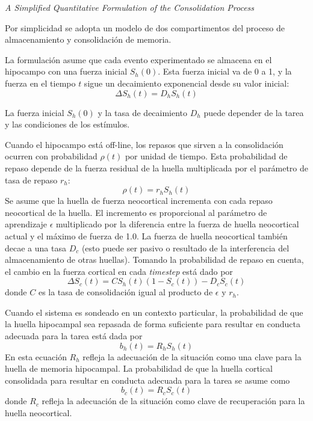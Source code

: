 \documentclass[a4paper,12pt]{article}
\begin{document}
{\itshape A Simplified Quantitative Formulation of the Consolidation Process}

Por simplicidad se adopta un modelo de dos compartimentos del proceso de almacenamiento y consolidación de memoria.

La formulación asume que cada evento experimentado se almacena en el hipocampo con una fuerza inicial $S_h(0)$. Esta fuerza inicial va de 0 a 1, y la fuerza en el tiempo $t$ sigue un decaimiento exponencial desde su valor inicial:
\begin{equation}
	\Delta S_h(t)= D_hS_h(t)
\end{equation}

La fuerza inicial $S_h(0)$ y la tasa de decaimiento $D_h$ puede depender de la tarea y las condiciones de los estímulos.

Cuando el hipocampo está off-line, los repasos que sirven a la consolidación ocurren con probabilidad $\rho(t)$ por unidad de tiempo. Esta probabilidad de repaso depende de la fuerza residual de la huella multiplicada por el parámetro de tasa de repaso $r_{h}$:
\begin{equation}
	\rho(t) = r_{h}S_{h}(t)
\end{equation}
Se asume que la huella de fuerza neocortical incrementa con cada repaso neocortical de la huella. El incremento es proporcional al parámetro de aprendizaje $\epsilon$ multiplicado por la diferencia entre la fuerza de huella neocortical actual y el máximo de fuerza de 1.0. La fuerza de huella neocortical también decae a una tasa $D_{c}$ (esto puede ser pasivo o resultado de la interferencia del almacenamiento de otras huellas). Tomando la probabilidad de repaso en cuenta, el cambio en la fuerza cortical en cada {\itshape timestep} está dado por
\begin{equation}
	\Delta S_{c}(t) = 
	CS_{h}(t)(1-S_{c}(t)) - D_{c}S_{c}(t)
\end{equation}
donde $C$ es la tasa de consolidación igual al producto de $\epsilon$ y $r_{h}$.

Cuando el sistema es sondeado en un contexto particular, la probabilidad de que la huella hipocampal sea repasada de forma suficiente para resultar en conducta adecuada para la tarea está dada por
\begin{equation}
	b_{h}(t) = R_{h}S_{h}(t)
\end{equation}
En esta ecuación $R_{h}$ refleja la adecuación de la situación como una clave para la huella de memoria hipocampal. La probabilidad de que la huella cortical consolidada para resultar en conducta adecuada para la tarea se asume como 
\begin{equation}
	b_{c}(t)
	=
	R_{c}S_{c}(t)
\end{equation}
donde $R_{c}$ refleja la adecuación de la situación como clave de  recuperación para la huella neocortical.
\end{document}
